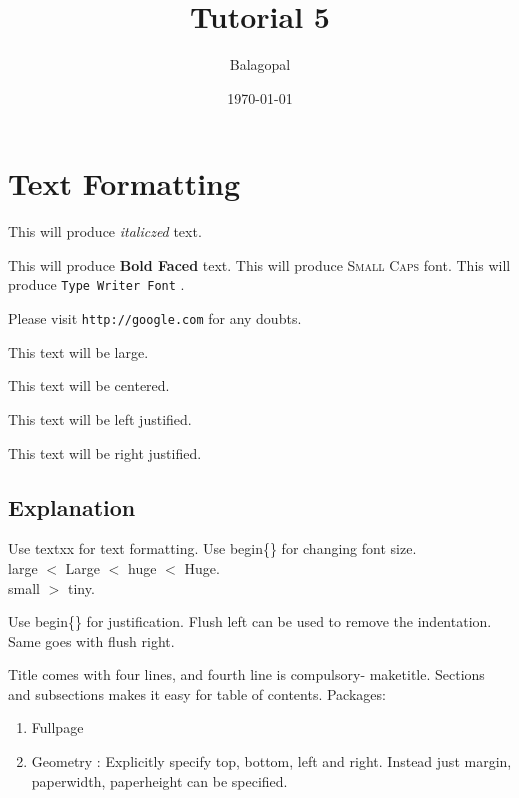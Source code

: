 \documentclass[11pt]{article}
\begin{document}
\tableofcontents

\title{Tutorial 5}
\author{Balagopal}
\date{\today}
\maketitle



\section{Text Formatting}

This will produce \textit{italiczed} text.

This will produce \textbf{Bold Faced} text.
This will produce \textsc{Small Caps} font. 
This will produce \texttt{Type Writer Font} .

Please visit \texttt{http://google.com} for any doubts.

\begin{Large}
This text will be large.
\end{Large}

\begin{center}
This text will be centered.
\end{center}
 
\begin{flushleft}
This text will be left justified.
\end{flushleft}

\begin{flushright}
This text will be right justified.
\end{flushright}

\subsection{Explanation}
Use textxx for text formatting. Use begin\{\} for changing font size. \\
large $<$ Large $<$ huge $<$ Huge. \\
small $>$ tiny.

Use begin\{\} for justification. 
Flush left can be used to remove the indentation.
Same goes with flush right.

Title comes with four lines, and fourth line is compulsory- maketitle.
Sections and subsections makes it easy for table of contents.
Packages:
\begin{enumerate}
\item Fullpage
\item Geometry : Explicitly specify top, bottom, left and right. Instead just margin, paperwidth, paperheight can be specified.
\end{enumerate}
\end{document}
